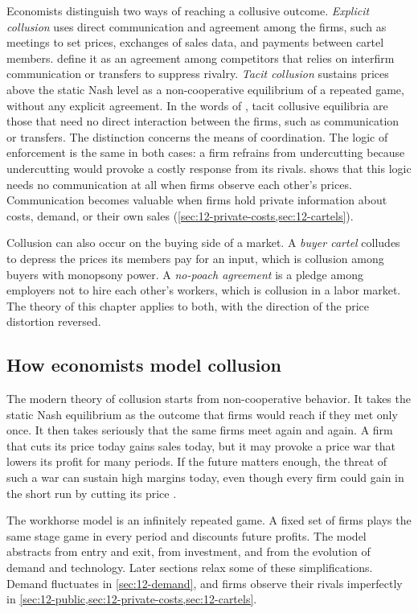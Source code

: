 Economists distinguish two ways of reaching a collusive outcome. \emph{Explicit collusion} uses direct
communication and agreement among the firms, such as meetings to set prices, exchanges of sales data, and payments
between cartel members. \citet[p.~ix]{MarshallMarx2012} define it as an agreement among competitors that relies on
interfirm communication or transfers to suppress rivalry. \emph{Tacit collusion} sustains prices above the static
Nash level as a non-cooperative equilibrium of a repeated game, without any explicit agreement. In the words of
\citet[p.~9]{MarshallMarx2012}, tacit collusive equilibria are those that need no direct interaction between the
firms, such as communication or transfers. The distinction concerns the means of coordination.
The logic of enforcement is the same in both cases: a firm refrains from undercutting because undercutting would
provoke a costly response from its rivals.  shows that this logic needs no communication at all
when firms observe each other's prices. Communication becomes valuable when firms hold private information about
costs, demand, or their own sales (\cref{sec:12-private-costs,sec:12-cartels}).

Collusion can also occur on the buying side of a market. A \emph{buyer cartel} colludes to depress the prices its
members pay for an input, which is collusion among buyers with monopsony power. A \emph{no-poach agreement} is a
pledge among employers not to hire each other's workers, which is collusion in a labor market. The theory of this
chapter applies to both, with the direction of the price distortion reversed.

\subsection{How economists model collusion}\label{sec:12-modelling}

The modern theory of collusion starts from non-cooperative behavior. It takes the static Nash equilibrium as the
outcome that firms would reach if they met only once. It then takes seriously that the same firms meet again and
again. A firm that cuts its price today gains sales today, but it may provoke a price war that lowers its profit for
many periods. If the future matters enough, the threat of such a war can sustain high margins today, even though
every firm could gain in the short run by cutting its price \citep{Friedman1971}.

The workhorse model is an infinitely repeated game. A fixed set of firms plays the same stage game in every period
and discounts future profits. The model abstracts from entry and exit, from investment, and from the evolution of
demand and technology. Later sections relax some of these simplifications. Demand fluctuates in
\cref{sec:12-demand}, and firms observe their rivals imperfectly in
\cref{sec:12-public,sec:12-private-costs,sec:12-cartels}.

